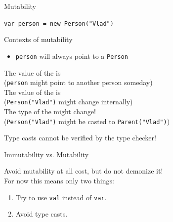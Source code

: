 \begin{frame}[fragile]{Mutability}
\begin{center}
\lstinline!var person = new Person("Vlad")!
\end{center}
\begin{block}{Contexts of mutability}
 
\begin{itemize}
\item \lstinline!person! will always point to a \lstinline!Person!
 
\end{itemize}
The value of the  is \\
(\lstinline!person! might point to \alert{another} person someday)\\
The value of the  is \\
(\lstinline!Person("Vlad")! might \alert{change internally})\\
The \alert{type} of the  might \alert{change}!\\
(\lstinline!Person("Vlad")! might be casted to \lstinline!Parent("Vlad")!)
\end{block}
\begin{center}
\alert{Type casts cannot be verified by the type checker!}
\end{center}
\end{frame}

\begin{frame}{Immutability vs. Mutability}
\begin{center}
Avoid mutability at all cost, but do not demonize it!\\
For now this means only two things:
\end{center}
\begin{enumerate}
  \item Try to use \lstinline!val! instead of \lstinline!var!.
  \item Avoid type casts.
\end{enumerate}
\end{frame}

